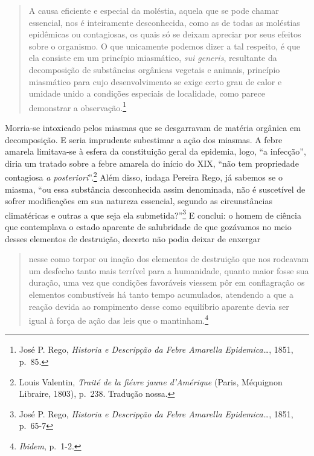 \begin{quote}
A causa eficiente e especial da moléstia, aquela que se pode chamar
essencial, nos é inteiramente desconhecida, como as de todas as
moléstias epidêmicas ou contagiosas, os quais só se deixam apreciar por
seus efeitos sobre o organismo. O que unicamente podemos dizer a tal
respeito, é que ela consiste em um princípio miasmático, \textit{sui
generis}, resultante da decomposição de substâncias orgânicas vegetais e
animais, princípio miasmático para cujo desenvolvimento se exige certo
grau de calor e umidade unido a condições especiais de localidade, como
parece demonstrar a observação.\footnote{José P. Rego, \textit{Historia e
  Descripção da Febre Amarella Epidemica\ldots{}}, 1851, p.~85.}
\end{quote}

Morria-se intoxicado pelos miasmas que se desgarravam de matéria
orgânica em decomposição. E seria imprudente subestimar a ação dos
miasmas. A febre amarela limitava-se à esfera da constituição geral da
epidemia, logo, ``a infecção'', diria um tratado sobre a febre amarela
do início do XIX, ``não tem propriedade contagiosa \textit{a
posteriori}''.\footnote{Louis Valentin, \textit{Traité de la fiévre jaune
  d'Amérique} (Paris, Méquignon Libraire, 1803), p.~238. Tradução nossa.}
Além disso, indaga Pereira Rego, já sabemos se o miasma, ``ou essa
substância desconhecida assim denominada, não é suscetível de sofrer
modificações em sua natureza essencial, segundo as circunstâncias
climatéricas e outras a que seja ela submetida?''\footnote{José P. Rego,
  \textit{Historia e Descripção da Febre Amarella Epidemica\ldots{}},
  1851, p.~65-7} E conclui: o homem de ciência que contemplava o estado
aparente de salubridade de que gozávamos no meio desses elementos de
destruição, decerto não podia deixar de enxergar

\begin{quote}
nesse como torpor ou inação dos elementos de destruição que nos rodeavam
um desfecho tanto mais terrível para a humanidade, quanto maior fosse
sua duração, uma vez que condições favoráveis viessem pôr em
conflagração os elementos combustíveis há tanto tempo acumulados,
atendendo a que a reação devida ao rompimento desse como equilíbrio
aparente devia ser igual à força de ação das leis que o
mantinham.\footnote{\textit{Ibidem}, p.~1-2.}
\end{quote}

